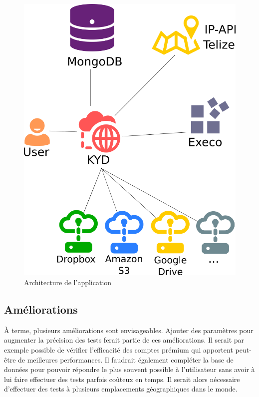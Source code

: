 \documentclass[10pt]{article}
\begin{document}
\begin{figure}[h] \centering \includegraphics[scale=0.3]{architecture.png}
\caption{Architecture de l'application} \label{fig:archi} \end{figure}

\subsection{Améliorations}

À terme, plusieurs améliorations sont envisageables. Ajouter des paramètres
pour augmenter la précision des tests ferait partie de ces améliorations. Il
serait par exemple possible de vérifier l'efficacité des comptes prémium qui
apportent peut-être de meilleures performances. Il faudrait également compléter
la base de données pour pouvoir répondre le plus souvent possible à
l'utilisateur sans avoir à lui faire effectuer des tests parfois coûteux en
temps. Il serait alors nécessaire d'effectuer des tests à plusieurs
emplacements géographiques dans le monde.
\end{document}
